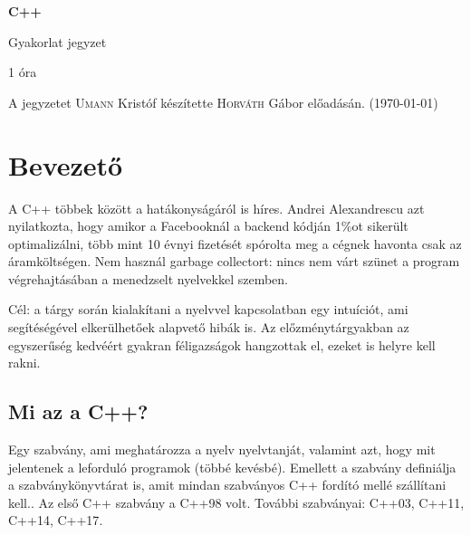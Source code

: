 \documentclass[a4paper,11.5pt]{article}
\begin{document}
	\setlength\parindent{0pt}
	\def\s{\hspace{0.2mm}\vphantom{\beta}}
	\def\Z{\mathbb{Z}}
	\def\Q{\mathbb{Q}}
	\def\R{\mathbb{R}}
	\def\C{\mathbb{C}}
	\def\N{\mathbb{N}}
	\def\Ra{\overline{\mathbb{R}}}
	
	\def\sume{\displaystyle\sum_{n=1}^{+\infty}}
	\def\sumn{\displaystyle\sum_{n=0}^{+\infty}}
	
	\def\narrow{\underset{n\rightarrow+\infty}{\longrightarrow}}
	\def\limn{\displaystyle\lim_{n\to +\infty}}
	\def\limx{\displaystyle\lim_{x\to +\infty}}
	
	\theoremstyle{definition}
	\newtheorem{theorem}{Tétel}[subsection] 
	
	\theoremstyle{definition}
	\newtheorem{definition}[theorem]{Definíció} 
	\newtheorem{example}[theorem]{Példa} 
	\newtheorem{task}[theorem]{Feladat} 
	\newtheorem{note}[theorem]{Megjegyzés}
	\begin{center}
		{\LARGE\textbf{C++}}
		
		{\Large Gyakorlat jegyzet}
		
		1 óra
	\end{center}
	A jegyzetet \textsc{Umann} Kristóf készítette \textsc{Horváth} Gábor  előadásán. (\today)
	\section{Bevezető}
	A C++ többek között a hatákonyságáról is híres. Andrei Alexandrescu azt nyilatkozta, hogy amikor a Facebooknál a backend kódján 1\%ot sikerült optimalizálni, több mint 10 évnyi fizetését spórolta meg a cégnek havonta csak az áramköltségen. Nem használ garbage collectort: nincs nem várt szünet a program végrehajtásában a menedzselt nyelvekkel szemben.
	
	\medskip
	Cél: a tárgy során kialakítani a nyelvvel kapcsolatban egy intuíciót, ami segítéségével elkerülhetőek alapvető hibák is. Az előzménytárgyakban az egyszerűség kedvéért gyakran féligazságok hangzottak el, ezeket is helyre kell rakni.
	\subsection{Mi az a C++?}
  Egy szabvány, ami meghatározza a nyelv nyelvtanját, valamint azt, hogy mit jelentenek a leforduló programok (többé kevésbé). Emellett a szabvány definiálja a szabványkönyvtárat is, amit mindan szabványos C++ fordító mellé szállítani kell.. Az első C++ szabvány a {C++98} volt. További szabványai: {C++03}, {C++11}, {C++14}, {C++17}.
	
\end{document}
